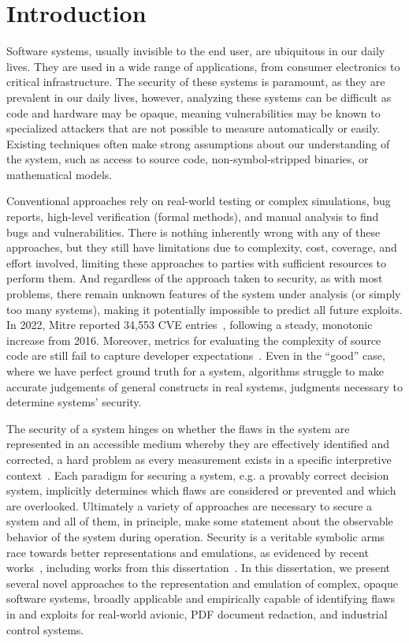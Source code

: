 \chapter{Introduction}

Software systems, usually invisible to the end user, are ubiquitous in our daily lives.
They are used in a wide range of applications, from consumer electronics to critical infrastructure.
The security of these systems is paramount, as they are prevalent in our daily lives, however, analyzing these systems can be difficult as code and hardware may be opaque, meaning vulnerabilities may be known to specialized attackers that are not possible to measure automatically or easily.
Existing techniques often make strong assumptions about our understanding of the system, such as access to source code, non-symbol-stripped binaries, or mathematical models.

Conventional approaches rely on real-world testing or complex simulations, bug reports, high-level verification (formal methods), and manual analysis to find bugs and vulnerabilities.
There is nothing inherently wrong with any of these approaches, but they still have limitations due to complexity, cost, coverage, and effort involved, limiting these approaches to parties with sufficient resources to perform them.
And regardless of the approach taken to security, as with most problems, there remain unknown features of the system under analysis (or simply too many systems), making it potentially impossible to predict all future exploits.
In 2022, Mitre reported 34,553 CVE entries~\cite{mitre2022}, following a steady, monotonic increase from 2016.
Moreover, metrics for evaluating the complexity of source code are still fail to capture developer expectations~\cite{pantiuchina2018improving, feigenspan2011exploring, feitelson2023code}.
Even in the ``good'' case, where we have perfect ground truth for a system, algorithms struggle to make accurate judgements of general constructs in real systems, judgments necessary to determine systems' security.

The security of a system hinges on whether the flaws in the system are represented in an accessible medium whereby they are effectively identified and corrected, a hard problem as every measurement exists in a specific interpretive context~\cite{stolfo2011measuring}.
Each paradigm for securing a system, e.g. a provably correct decision system, implicitly determines which flaws are considered or prevented and which are overlooked.
Ultimately a variety of approaches are necessary to secure a system and all of them, in principle, make some statement about the observable behavior of the system during operation.
Security is a veritable symbolic arms race towards better representations and emulations, as evidenced by recent works~\cite{shoshitaishvili2016sok, arp2022and, chen2022metaemu}, including works from this dissertation~\cite{johnson2021jetset, bland2023story, bland2023integreat}.
In this dissertation, we present several novel approaches to the representation and emulation of complex, opaque software systems, broadly applicable and empirically capable of identifying flaws in and exploits for real-world avionic, PDF document redaction, and industrial control systems.

